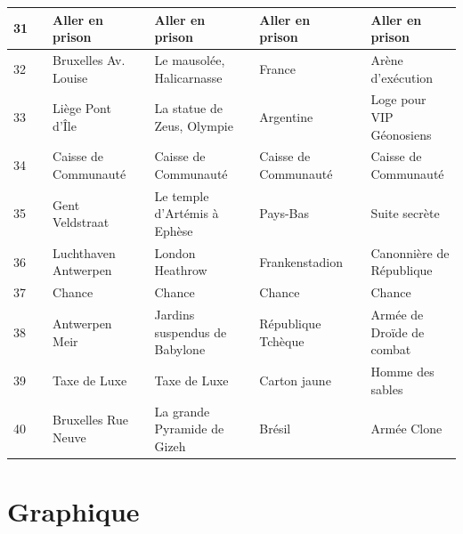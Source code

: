 \documentclass[letterpaper]{article}
\begin{document}
{\begin{tabular}{|l|l|l|l|l|l|l|l|l|}
      31 & \cellcolor[HTML]{BEBEBE} & Aller en prison & \cellcolor[HTML]{BEBEBE} & Aller en prison & \cellcolor[HTML]{BEBEBE} & Aller en prison & \cellcolor[HTML]{BEBEBE} & Aller en prison \\ \hline
      32 & \cellcolor[HTML]{2E8B57} & Bruxelles Av. Louise & \cellcolor[HTML]{2E8B57} & Le mausolée, Halicarnasse & \cellcolor[HTML]{2E8B57} & France & \cellcolor[HTML]{2E8B57} & Arène d'exécution \\ \hline
      33 & \cellcolor[HTML]{2E8B57} & Liège Pont d'Île & \cellcolor[HTML]{2E8B57} & La statue de Zeus, Olympie & \cellcolor[HTML]{2E8B57} & Argentine & \cellcolor[HTML]{2E8B57} & Loge pour VIP Géonosiens \\ \hline
      34 & \cellcolor[HTML]{EEEED1} & Caisse de Communauté & \cellcolor[HTML]{EEEED1} & Caisse de Communauté & \cellcolor[HTML]{EEEED1} & Caisse de Communauté & \cellcolor[HTML]{EEEED1} & Caisse de Communauté \\ \hline
      35 & \cellcolor[HTML]{2E8B57} & Gent Veldstraat & \cellcolor[HTML]{2E8B57} & Le temple d'Artémis à Ephèse & \cellcolor[HTML]{2E8B57} & Pays-Bas & \cellcolor[HTML]{2E8B57} & Suite secrète \\ \hline
      36 & \cellcolor[HTML]{E6E6FA} & Luchthaven Antwerpen & \cellcolor[HTML]{E6E6FA} & London Heathrow & \cellcolor[HTML]{E6E6FA} & Frankenstadion & \cellcolor[HTML]{E6E6FA} & Canonnière de République \\ \hline
      37 & \cellcolor[HTML]{FFC1C1} & Chance & \cellcolor[HTML]{FFC1C1} & Chance & \cellcolor[HTML]{FFC1C1} & Chance & \cellcolor[HTML]{FFC1C1} & Chance \\ \hline
      38 & \cellcolor[HTML]{483D8B} & Antwerpen Meir & \cellcolor[HTML]{483D8B} & Jardins suspendus de Babylone & \cellcolor[HTML]{483D8B} & République Tchèque & \cellcolor[HTML]{483D8B} & Armée de Droïde de combat \\ \hline
      39 & \cellcolor[HTML]{8B1A1A} & Taxe de Luxe & \cellcolor[HTML]{8B1A1A} & Taxe de Luxe & \cellcolor[HTML]{8B1A1A} & Carton jaune & \cellcolor[HTML]{8B1A1A} & Homme des sables \\ \hline
      40 & \cellcolor[HTML]{483D8B} & Bruxelles Rue Neuve & \cellcolor[HTML]{483D8B} & La grande Pyramide de Gizeh &\cellcolor[HTML]{483D8B} & Brésil &\cellcolor[HTML]{483D8B} & Armée Clone\\ \hline
      \end{tabular}
    }

    \newpage

    \section{Graphique}
      \label{annexe:graphe}
\end{document}
